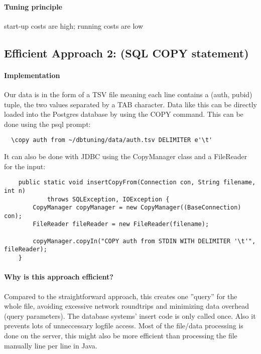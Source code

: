 \documentclass[11pt]{scrartcl}
\begin{document}
  \paragraph{Tuning principle}

  start-up costs are high; running costs are low

    \subsection*{Efficient Approach 2: (SQL COPY statement)}

  \paragraph{Implementation}

  Our data is in the form of a TSV file meaning each line contains a
  (auth, pubid) tuple, the two values separated by a TAB character. Data like this can be
  directly loaded into the Postgres database by using the COPY command. This can be
  done using the psql prompt:
  
  {\small
\begin{verbatim}
  \copy auth from ~/dbtuning/data/auth.tsv DELIMITER e'\t'
\end{verbatim}
}

It can also be done with JDBC using the CopyManager class and a FileReader
for the input:

{\small
\begin{verbatim}
	public static void insertCopyFrom(Connection con, String filename, int n)
	        throws SQLException, IOException {
	    CopyManager copyManager = new CopyManager((BaseConnection) con);
	    FileReader fileReader = new FileReader(filename);
		
	    copyManager.copyIn("COPY auth from STDIN WITH DELIMITER '\t'", fileReader);
	}
\end{verbatim}
}

  \paragraph{Why is this approach efficient?}

  Compared to the straightforward approach, this creates one ''query''
  for the whole file, avoiding excessive network roundtrips and minimizing
  data overhead (query parameters). The database systems' insert code
  is only called once. Also it prevents lots of unneccessary
  logfile access. Most of the file/data processing
  is done on the server, this might also be more efficient than
  processing the file manually line per line in Java.
  
\end{document}
